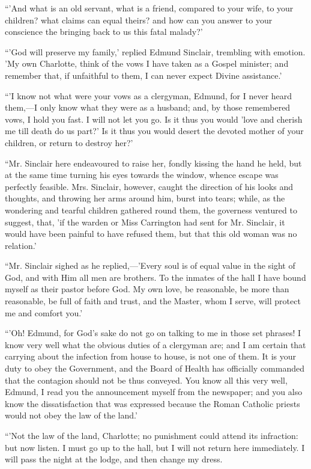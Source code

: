``'And what is an old servant, what
is a friend, compared to your wife, to your children? what claims can
equal theirs? and how can you answer to your conscience the bringing
back to us this fatal malady?'

``'God will preserve my family,'
replied Edmund Sinclair, trembling with emotion. 'My own Charlotte,
think of the vows I have taken as a Gospel minister; and remember that,
if unfaithful to them, I can never expect Divine assistance.'

``'I know not what were your vows as
a clergyman, Edmund, for I never heard them,—I only know what they
were as a husband; and, by those remembered vows, I hold you fast. I
will not let you go. Is it thus you would 'love and cherish me till
death do us part?' Is it thus you would desert the devoted mother of
your children, or return to destroy her?'

``Mr. Sinclair here endeavoured to
raise her, fondly kissing the hand he held, but at the same time turning
his eyes towards the window, whence escape was perfectly feasible. Mrs.
Sinclair, however, caught the direction of his looks and thoughts, and
throwing her arms around him, burst into tears; while, as the wondering
and tearful children gathered round them, the governess ventured to
suggest, that, 'if the warden or Miss Carrington had sent for Mr.
Sinclair, it would have been painful to have refused them, but that this
old woman was no relation.'

``Mr. Sinclair sighed as he
replied,—'Every soul is of equal value in the sight of God, and with
Him all men are brothers. To the inmates of the hall I have bound myself
as their pastor before God. My own love, be reasonable, be more than
reasonable, be full of faith and trust, and the Master, whom I serve,
will protect me and comfort you.'

``'Oh! Edmund, for God's sake do not
go on talking to me in those set phrases! I know very well what the
obvious duties of a clergyman are; and I am certain that carrying about
the infection from house to house, is not one of them. It is your duty
to obey the Government, and the Board of Health has officially commanded
that the contagion should not be thus conveyed. You know all this very
well, Edmund, I read you the announcement myself from the newspaper; and
you also know the dissatisfaction that was expressed because the Roman
Catholic priests would not obey the law of the land.'

``'Not the law of the land,
Charlotte; no punishment could attend its infraction: but now listen. I
must go up to the hall, but I will not return here immediately. I will
pass the night at the lodge, and then change my dress.


